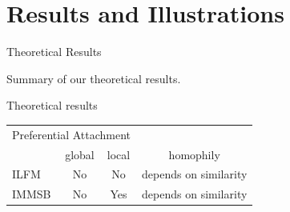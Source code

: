 \section{Results and Illustrations}

\begin{frame}[c]{Theoretical Results}

    Summary of our theoretical results. %
    \vspace{1cm}


    \begin{block}{Theoretical results}
	\begin{tabular}{l|cc|c}

        \multicolumn{3}{c}{\hspace{1.3cm}Preferential Attachment}   \\
        \cmidrule(l){2-3} 
        &   global & local  &   homophily      \\
        \hline
        ILFM       & \cellcolor{red!25}No & \cellcolor{red!25}No   & depends on similarity  \\
        IMMSB       & \cellcolor{red!25}No & \cellcolor{green!25}Yes  & depends on similarity \\
    \end{tabular}

    \end{block}

\end{frame}

